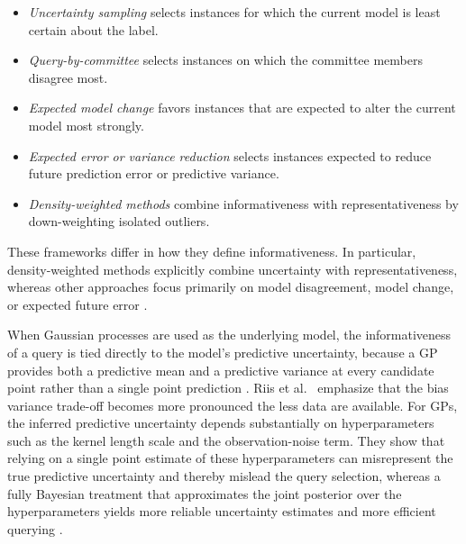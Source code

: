 \documentclass[12pt,a4paper]{report}
\begin{document}
        \begin{itemize}
            \item \emph{Uncertainty sampling} selects instances for which the
            current model is least certain about the label.

            \item \emph{Query-by-committee} selects instances on which the
            committee members disagree most.

            \item \emph{Expected model change} favors instances that are expected
            to alter the current model most strongly.

            \item \emph{Expected error or variance reduction} selects instances
            expected to reduce future prediction error or predictive variance.

            \item \emph{Density-weighted methods} combine informativeness with
            representativeness by down-weighting isolated outliers.
        \end{itemize}
        These frameworks differ in how they define informativeness. In particular, density-weighted methods explicitly combine uncertainty with representativeness, whereas other approaches focus primarily on model disagreement, model change, or expected future error \cite{settles2009active}.

        When Gaussian processes are used as the underlying model, the informativeness of a query is tied directly to the model's predictive uncertainty, because a GP provides both a predictive mean and a predictive variance at every candidate point rather than a single point prediction \cite{riis2022bayesian}. Riis et al.~\cite{riis2022bayesian} emphasize that the bias variance trade-off becomes more pronounced the less data are available. For GPs, the inferred predictive uncertainty depends substantially on hyperparameters such as the kernel length scale and the observation-noise term. They show that relying on a single point estimate of these hyperparameters can misrepresent the true predictive uncertainty and thereby mislead the query selection, whereas a fully Bayesian treatment that approximates the joint posterior over the hyperparameters yields more reliable uncertainty estimates and more efficient querying \cite{riis2022bayesian}.
\end{document}
